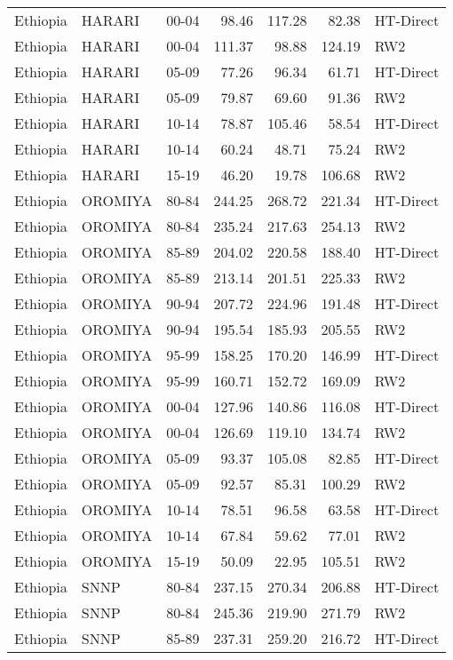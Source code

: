 \begin{longtable}{lllrrrl}
  Ethiopia & HARARI & 00-04 & 98.46 & 117.28 & 82.38 & HT-Direct \\ 
  Ethiopia & HARARI & 00-04 & 111.37 & 98.88 & 124.19 & RW2 \\ 
  Ethiopia & HARARI & 05-09 & 77.26 & 96.34 & 61.71 & HT-Direct \\ 
  Ethiopia & HARARI & 05-09 & 79.87 & 69.60 & 91.36 & RW2 \\ 
  Ethiopia & HARARI & 10-14 & 78.87 & 105.46 & 58.54 & HT-Direct \\ 
  Ethiopia & HARARI & 10-14 & 60.24 & 48.71 & 75.24 & RW2 \\ 
  Ethiopia & HARARI & 15-19 & 46.20 & 19.78 & 106.68 & RW2 \\ 
  Ethiopia & OROMIYA & 80-84 & 244.25 & 268.72 & 221.34 & HT-Direct \\ 
  Ethiopia & OROMIYA & 80-84 & 235.24 & 217.63 & 254.13 & RW2 \\ 
  Ethiopia & OROMIYA & 85-89 & 204.02 & 220.58 & 188.40 & HT-Direct \\ 
  Ethiopia & OROMIYA & 85-89 & 213.14 & 201.51 & 225.33 & RW2 \\ 
  Ethiopia & OROMIYA & 90-94 & 207.72 & 224.96 & 191.48 & HT-Direct \\ 
  Ethiopia & OROMIYA & 90-94 & 195.54 & 185.93 & 205.55 & RW2 \\ 
  Ethiopia & OROMIYA & 95-99 & 158.25 & 170.20 & 146.99 & HT-Direct \\ 
  Ethiopia & OROMIYA & 95-99 & 160.71 & 152.72 & 169.09 & RW2 \\ 
  Ethiopia & OROMIYA & 00-04 & 127.96 & 140.86 & 116.08 & HT-Direct \\ 
  Ethiopia & OROMIYA & 00-04 & 126.69 & 119.10 & 134.74 & RW2 \\ 
  Ethiopia & OROMIYA & 05-09 & 93.37 & 105.08 & 82.85 & HT-Direct \\ 
  Ethiopia & OROMIYA & 05-09 & 92.57 & 85.31 & 100.29 & RW2 \\ 
  Ethiopia & OROMIYA & 10-14 & 78.51 & 96.58 & 63.58 & HT-Direct \\ 
  Ethiopia & OROMIYA & 10-14 & 67.84 & 59.62 & 77.01 & RW2 \\ 
  Ethiopia & OROMIYA & 15-19 & 50.09 & 22.95 & 105.51 & RW2 \\ 
  Ethiopia & SNNP & 80-84 & 237.15 & 270.34 & 206.88 & HT-Direct \\ 
  Ethiopia & SNNP & 80-84 & 245.36 & 219.90 & 271.79 & RW2 \\ 
  Ethiopia & SNNP & 85-89 & 237.31 & 259.20 & 216.72 & HT-Direct \\ 

\end{longtable}

